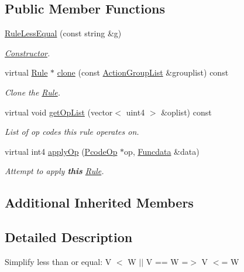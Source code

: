 \subsection*{Public Member Functions}
\begin{DoxyCompactItemize}
\item 
\mbox{\hyperlink{class_rule_less_equal_a74d843e75afced562d6b638e713f1414}{Rule\+Less\+Equal}} (const string \&g)
\begin{DoxyCompactList}\small\item\em \mbox{\hyperlink{class_constructor}{Constructor}}. \end{DoxyCompactList}\item 
virtual \mbox{\hyperlink{class_rule}{Rule}} $\ast$ \mbox{\hyperlink{class_rule_less_equal_ab4b8ad51cf9caf54df481de1346ee60f}{clone}} (const \mbox{\hyperlink{class_action_group_list}{Action\+Group\+List}} \&grouplist) const
\begin{DoxyCompactList}\small\item\em Clone the \mbox{\hyperlink{class_rule}{Rule}}. \end{DoxyCompactList}\item 
virtual void \mbox{\hyperlink{class_rule_less_equal_ad28269c12f51c77f7f3cf236eaba93ca}{get\+Op\+List}} (vector$<$ uint4 $>$ \&oplist) const
\begin{DoxyCompactList}\small\item\em List of op codes this rule operates on. \end{DoxyCompactList}\item 
virtual int4 \mbox{\hyperlink{class_rule_less_equal_ab76fe328e8caf6ab480a60e3fb1927bf}{apply\+Op}} (\mbox{\hyperlink{class_pcode_op}{Pcode\+Op}} $\ast$op, \mbox{\hyperlink{class_funcdata}{Funcdata}} \&data)
\begin{DoxyCompactList}\small\item\em Attempt to apply {\bfseries{this}} \mbox{\hyperlink{class_rule}{Rule}}. \end{DoxyCompactList}\end{DoxyCompactItemize}
\subsection*{Additional Inherited Members}


\subsection{Detailed Description}
Simplify \textquotesingle{}less than or equal\textquotesingle{}\+: {\ttfamily V $<$ W $\vert$$\vert$ V == W =$>$ V $<$= W} 

